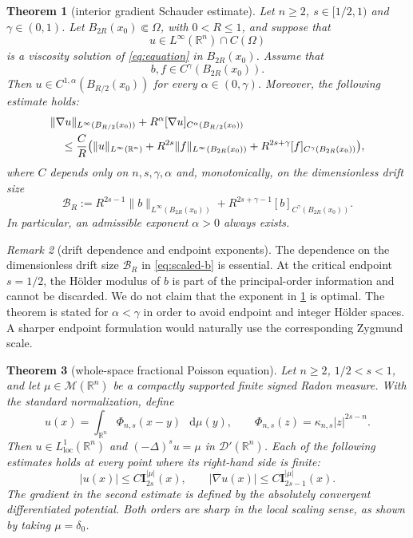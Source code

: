 \documentclass[reqno]{amsart}
\numberwithin{equation}{section}
\theoremstyle{plain}
\newtheorem{theorem}{Theorem}[section]
\theoremstyle{definition}
\theoremstyle{remark}
\newtheorem{remark}[theorem]{Remark}
\newcommand{\R}{\mathbb R}
\newcommand{\M}{\mathcal M}
\newcommand{\I}{\mathbf I}
\newcommand{\differential}{\mathop{}\!\mathrm d}
\begin{document}
\begin{theorem}[interior gradient Schauder estimate]\label{thm:main}
Let $n\ge2$, $s\in[1/2,1)$ and $\gamma\in(0,1)$.  Let
$B_{2R}(x_0)\Subset\Omega$, with $0<R\le1$, and suppose that
\[
 u\in L^\infty(\R^n)\cap C(\Omega)
\]
is a viscosity solution of \eqref{eq:equation} in $B_{2R}(x_0)$.
Assume that
\[
 b,f\in C^\gamma(B_{2R}(x_0)).
\]
Then $u\in C^{1,\alpha}(B_{R/2}(x_0))$ for every
$\alpha\in(0,\gamma)$.  Moreover, the following estimate holds:
\begin{align}\label{eq:main-estimate}
 &\|\nabla u\|_{L^\infty(B_{R/2}(x_0))}
 +R^\alpha[\nabla u]_{C^\alpha(B_{R/2}(x_0))}\notag\\
 &\quad\le \frac{C}{R}\bigl(
 \|u\|_{L^\infty(\R^n)}
 +R^{2s}\|f\|_{L^\infty(B_{2R}(x_0))}
 +R^{2s+\gamma}[f]_{C^\gamma(B_{2R}(x_0))}\bigr),
\end{align}
where $C$ depends only on $n,s,\gamma,\alpha$ and, monotonically, on the
dimensionless drift size
\begin{equation}\label{eq:scaled-b}
 \mathcal B_R:=R^{2s-1}\|b\|_{L^\infty(B_{2R}(x_0))}
 +R^{2s+\gamma-1}[b]_{C^\gamma(B_{2R}(x_0))}.
\end{equation}
In particular, an admissible exponent $\alpha>0$ always exists.
\end{theorem}

\begin{remark}[drift dependence and endpoint exponents]
The dependence on the dimensionless drift size $\mathcal B_R$ in
\eqref{eq:scaled-b} is essential.  At the critical endpoint $s=1/2$, the
H\"older modulus of $b$ is part of the principal-order information and
cannot be discarded.  We do not claim that the exponent in
\cref{thm:main} is optimal.  The theorem is stated for $\alpha<\gamma$ in
order to avoid endpoint and integer H\"older spaces.  A sharper endpoint
formulation would naturally use the corresponding Zygmund scale.
\end{remark}

\begin{theorem}[whole-space fractional Poisson equation]
\label{thm:whole-space-potential}
Let $n\ge2$, $1/2<s<1$, and let $\mu\in\M(\R^n)$ be a compactly
supported finite signed Radon measure.  With the standard normalization,
define
\begin{equation}\label{eq:whole-space-solution}
 u(x)=\int_{\R^n}\Phi_{n,s}(x-y)\,\differential\mu(y),
 \qquad \Phi_{n,s}(z)=\kappa_{n,s}|z|^{2s-n}.
\end{equation}
Then $u\in L^1_{\mathrm{loc}}(\R^n)$ and $(-\Delta)^su=\mu$ in
$\mathcal D'(\R^n)$.  Each of the following estimates holds at every point
where its right-hand side is finite:
\begin{equation}\label{eq:whole-space-potential-estimates}
 |u(x)|\le C\I_{2s}^{|\mu|}(x),\qquad
 |\nabla u(x)|\le C\I_{2s-1}^{|\mu|}(x).
\end{equation}
The gradient in the second estimate is defined by the absolutely convergent
differentiated potential.  Both orders are sharp in the local scaling sense,
as shown by taking $\mu=\delta_0$.
\end{theorem}
\end{document}
